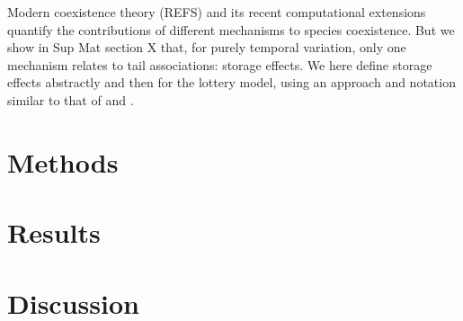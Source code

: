 \documentclass[letterpaper,11pt]{article}\usepackage[]{graphicx}\usepackage[]{color}
\begin{document}
Modern coexistence theory (REFS) and its recent computational extensions \citep{Ellner_2016,Ellner_2019} 
quantify the contributions of 
different mechanisms to species coexistence. But we show in Sup Mat section X
that, for purely temporal variation, only one mechanism relates to tail associations: storage effects. 
We here define storage effects abstractly and then for the lottery model, using an approach and notation
similar to that of \cite{Ellner_2016} and \cite{Ellner_2019}.

\section{Methods}\label{section:methods}


\section{Results}\label{section:results}


\section{Discussion}\label{section:discussion}


\clearpage
\newpage



\end{document}

